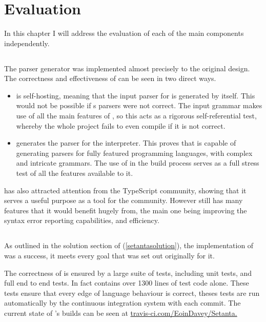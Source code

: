 \chapter{Evaluation}

In this chapter I will address the evaluation of each of the main components independently.

\section{\tsPEG{}}

The \tsPEG{} parser generator was implemented almost precisely to the original design. The correctness and effectiveness of \tsPEG{} can be seen in two direct ways.
\begin{itemize}
    \item \tsPEG{} is self-hosting, meaning that the input parser for \tsPEG{} is generated by \tsPEG{} itself. This would not be possible if \tsPEG{}s parsers were not correct. The input grammar makes use of all the main features of \tsPEG{}, so this acts as a rigorous self-referential test, whereby the whole project fails to even compile if it is not correct.
    \item \tsPEG{} generates the parser for the \Setanta{} interpreter. This proves that \tsPEG{} is capable of generating parsers for fully featured programming languages, with complex and intricate grammars. The use of \tsPEG{} in the \Setanta{} build process serves as a full stress test of all the features available to it.
\end{itemize}

\tsPEG{} has also attracted attention from the TypeScript community, showing that it serves a useful purpose as a tool for the community. However \tsPEG{} still has many features that it would benefit hugely from, the main one being improving the syntax error reporting capabilities, and efficiency.

\section{\Setanta{}}

As outlined in the solution section of \Setanta{} (\ref{setantasolution}), the implementation of \Setanta{} was a success, it meets every goal that was set out originally for it.

The correctness of \Setanta{} is ensured by a large suite of tests, including unit tests, and full end to end tests. In fact \Setanta{} contains over 1300 lines of test code alone. These tests ensure that every edge of language behaviour is correct, theses tests are run automatically by the continuous integration system with each commit. The current state of \Setanta{}'s builds can be seen at \href{https://travis-ci.com/EoinDavey/Setanta}{travis-ci.com/EoinDavey/Setanta.}

